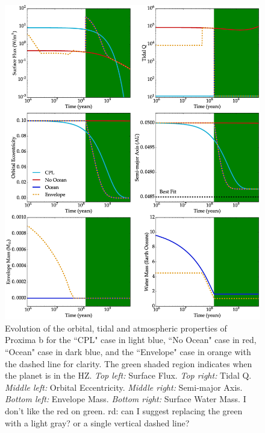\documentclass[preprint,12pt]{aastex}
\newcommand{\xxx}[1]{{\color{red} #1}} %
\begin{document}
\begin{figure} 
\centering
\includegraphics[width=1.0\textwidth,height=0.9\textheight]{tidal_hec.eps}
\caption{Evolution of the orbital, tidal and atmospheric properties of
  Proxima b for the ``CPL" case in light blue, ``No Ocean" case in
  red, ``Ocean" case in dark blue, and the ``Envelope" case in orange
  with the dashed line for clarity.  The green shaded region indicates
  when the planet is in the HZ. {\it Top left:} Surface Flux. {\it Top
    right:} Tidal Q. {\it Middle left:} Orbital Eccentricity. {\it
    Middle right:} Semi-major Axis. {\it Bottom left:} Envelope
  Mass. {\it Bottom right:} Surface Water Mass. \xxx{I don't like the red on green.} 
  \xxx{rd: can I suggest replacing the green with a light gray? or a single vertical 
  dashed line?} }
\label{fig:tidal_hec}
\end{figure}

\end{document}
